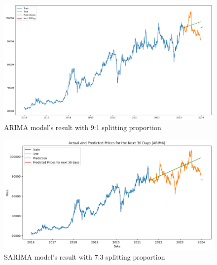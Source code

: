 \documentclass{ieeeojies}
\begin{document}
\begin{figure}[H]
  \centering
  \begin{minipage}{0.8\linewidth}
    \centering
    \includegraphics[width=\linewidth]{bibliography/ARIMA_VCB91.png}
    \caption{ARIMA model's result with 9:1 splitting proportion}
    \label{fig11}
  \end{minipage}
\end{figure}
\begin{figure}[H]
  \centering
  \begin{minipage}{0.8\linewidth}
    \centering
    \includegraphics[width=\linewidth]{bibliography/SARIMA_VCB73.png}
    \caption{SARIMA model's result with 7:3 splitting proportion}
    \label{fig12}
  \end{minipage}
\end{figure}
\end{document}
